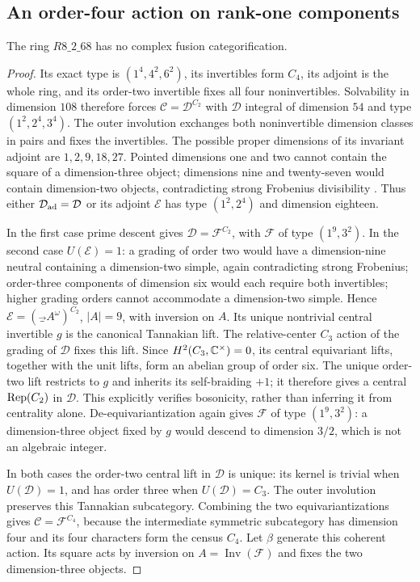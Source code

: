 \subsection{An order-four action on rank-one components}
\begin{proposition}\label{prop:r108}
The ring $R8\_2\_68$ has no complex fusion categorification.
\end{proposition}
\begin{proof}
Its exact type is $(1^4,4^2,6^2)$, its invertibles form $C_4$, its
adjoint is the whole ring, and its order-two invertible fixes all four
noninvertibles. Solvability in dimension $108$ therefore forces
$\mathcal C=\mathcal D^{C_2}$ with $\mathcal D$ integral of dimension
$54$ and type $(1^2,2^4,3^4)$. The outer involution exchanges both
noninvertible dimension classes in pairs and fixes the invertibles.
The possible proper dimensions of its invariant adjoint are
$1,2,9,18,27$. Pointed dimensions one and two cannot contain the square
of a dimension-three object; dimensions nine and twenty-seven would
contain dimension-two objects, contradicting strong Frobenius
divisibility \cite{ENOSolvable}. Thus either
$\mathcal D_{\rm ad}=\mathcal D$ or its adjoint $\mathcal E$ has type
$(1^2,2^4)$ and dimension eighteen.

In the first case prime descent gives
$\mathcal D=\mathcal F^{C_2}$, with $\mathcal F$ of type $(1^9,3^2)$.
In the second case $U(\mathcal E)=1$: a grading of order two would
have a dimension-nine neutral containing a dimension-two simple,
again contradicting strong Frobenius; order-three components of
dimension six would each require both invertibles; higher grading
orders cannot accommodate a dimension-two simple. Hence
$\mathcal E=(\Vec_A^\omega)^{C_2}$, $|A|=9$, with inversion on $A$.
Its unique nontrivial central invertible $g$ is the canonical
Tannakian lift. The relative-center $C_3$ action of the grading of
$\mathcal D$ fixes this lift. Since $H^2(C_3,\mathbb C^\times)=0$, its
central equivariant lifts, together with the unit lifts, form an
abelian group of order six. The unique order-two lift restricts to
$g$ and inherits its self-braiding $+1$; it therefore gives a central
$\operatorname{Rep}(C_2)$ in $\mathcal D$. This explicitly verifies bosonicity,
rather than inferring it from centrality alone.
De-equivariantization again gives $\mathcal F$ of type $(1^9,3^2)$:
a dimension-three object fixed by $g$ would descend to dimension
$3/2$, which is not an algebraic integer.

In both cases the order-two central lift in $\mathcal D$ is unique:
its kernel is trivial when $U(\mathcal D)=1$, and has order three
when $U(\mathcal D)=C_3$. The outer involution preserves this
Tannakian subcategory. Combining the two equivariantizations gives
$\mathcal C=\mathcal F^{C_4}$, because the intermediate symmetric
subcategory has dimension four and its four characters form the
census $C_4$. Let $\beta$ generate this coherent action. Its square
acts by inversion on $A=\operatorname{Inv}(\mathcal F)$ and fixes
the two dimension-three objects.


\end{proof}
